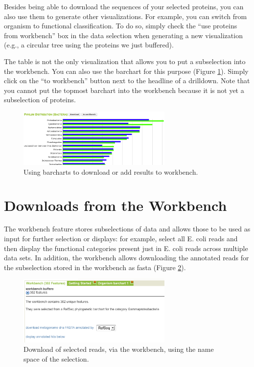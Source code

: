 \documentclass[12pt,fullpage]{report}
\begin{document}
Besides being able to download the sequences of your selected proteins, you can also use them to generate other visualizations. For example, you can switch from organism to functional classification. To do so, simply check the ``use proteins from workbench'' box in the data selection when generating a new visualization (e.g., a circular tree using the proteins we just buffered).

The table is not the only visualization that allows you to put a subselection into the workbench. You can also use the barchart for this purpose (Figure \ref{fig:barchart-from-workbench}). Simply click on the ``to workbench'' button next to the headline of a drilldown. Note that you cannot put the topmost barchart into the workbench because it is not yet a subselection of proteins.

\begin{figure}
\begin{center}
\includegraphics[width=3in]{Images/barchart-from-workbench.png}
\end{center}
\caption{Using barcharts to download or add results to workbench.}
\label{fig:barchart-from-workbench}
\end{figure}

\section{Downloads from the Workbench}

The workbench feature stores subselections of data and allows those to be used as input for further selection or displays: for example, select all E. coli reads and then display the functional categories present just in E. coli reads across multiple data sets. In addition, the workbench allows downloading the annotated reads for the subselection stored in the workbench as fasta (Figure \ref{fig:workbench-download}).

\begin{figure}
\begin{center}
\includegraphics[width=3in]{Images/workbench-download.png}
\end{center}
\caption{
Download of selected reads, via the workbench, using the name space of the selection.
}
\label{fig:workbench-download}
\end{figure}
\end{document}
